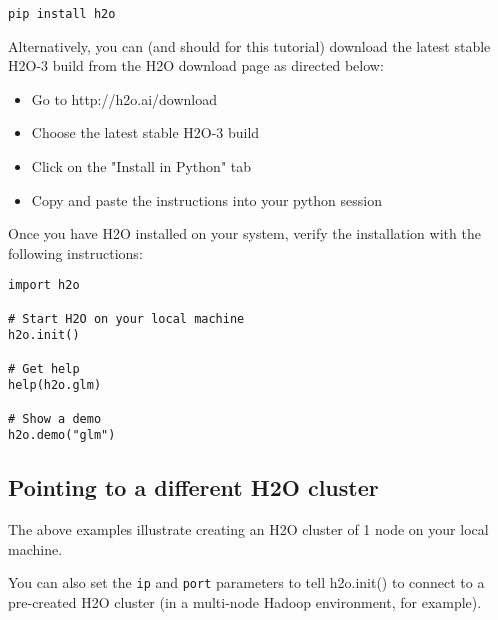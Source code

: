 \begin{lstlisting}[style=python]
pip install h2o
\end{lstlisting}

Alternatively, you can (and should for this tutorial) download the
latest stable H2O-3 build from the H2O download page as directed
below:

\begin{itemize}
\item Go to http://h2o.ai/download
\item Choose the latest stable H2O-3 build
\item Click on the "Install in Python" tab
\item Copy and paste the instructions into your python session
\end{itemize}

\bigskip
Once you have H2O installed on your system, verify the installation
with the following instructions:

\begin{lstlisting}[style=python]
import h2o

# Start H2O on your local machine
h2o.init()

# Get help
help(h2o.glm)

# Show a demo
h2o.demo("glm")
\end{lstlisting}

\subsection{Pointing to a different H2O cluster}

The above examples illustrate creating an H2O cluster of 1 node on
your local machine.

You can also set the \texttt{ip} and \texttt{port} parameters to tell
h2o.init() to connect to a pre-created H2O cluster (in a multi-node
Hadoop environment, for example).
